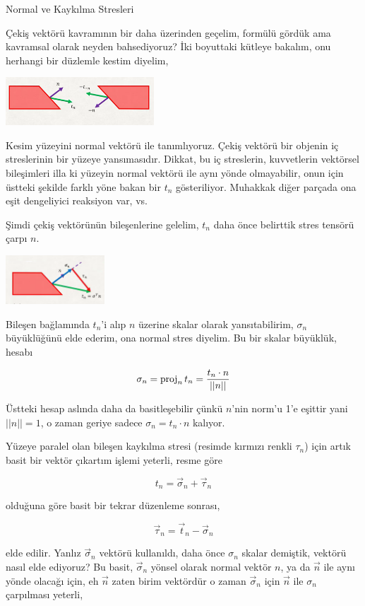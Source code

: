 \documentclass[12pt,fleqn]{article}\usepackage{../../common}
\begin{document}
Normal ve Kaykılma Stresleri

Çekiş vektörü kavramının bir daha üzerinden geçelim, formülü gördük ama
kavramsal olarak neyden bahsediyoruz? İki boyuttaki kütleye bakalım, onu
herhangi bir düzlemle kestim diyelim, 

\includegraphics[width=15em]{phy_020_strs_02_06.png}

Kesim yüzeyini normal vektörü ile tanımlıyoruz. Çekiş vektörü bir objenin iç
streslerinin bir yüzeye yansımasıdır. Dikkat, bu iç streslerin, kuvvetlerin
vektörsel bileşimleri illa ki yüzeyin normal vektörü ile aynı yönde olmayabilir,
onun için üstteki şekilde farklı yöne bakan bir $t_n$ gösteriliyor. Muhakkak
diğer parçada ona eşit dengeliyici reaksiyon var, vs.

Şimdi çekiş vektörünün bileşenlerine gelelim, $t_n$ daha önce belirttik stres
tensörü çarpı $n$. 

\includegraphics[width=10em]{phy_020_strs_02_07.png}

Bileşen bağlamında $t_n$'i alıp $n$ üzerine skalar olarak yansıtabilirim,
$\sigma_n$ büyüklüğünü elde ederim, ona normal stres diyelim. Bu bir skalar
büyüklük, hesabı

$$
\sigma_n = \operatorname{proj}_n t_n = \frac{t_n \cdot n}{||n||}
$$

Üstteki hesap aslında daha da basitleşebilir çünkü $n$'nin norm'u 1'e
eşittir yani $||n||=1$, o zaman geriye sadece $\sigma_n = t_n \cdot n$
kalıyor.

Yüzeye paralel olan bileşen kaykılma stresi (resimde kırmızı renkli $\tau_n$)
için artık basit bir vektör çıkartım işlemi yeterli, resme göre

$$
t_n = \vec{\sigma}_n + \vec{\tau}_n 
$$

olduğuna göre basit bir tekrar düzenleme sonrası,

$$
\vec{\tau}_n  = \vec{t}_n - \vec{\sigma}_n 
$$

elde edilir. Yanlız $\vec{\sigma}_n$ vektörü kullanıldı, daha önce $\sigma_n$
skalar demiştik, vektörü nasıl elde ediyoruz? Bu basit, $\vec{\sigma}_n$
yönsel olarak normal vektör $n$, ya da $\vec{n}$ ile aynı yönde olacağı
için, eh $\vec{n}$ zaten birim vektördür o zaman $\vec{\sigma}_n$ için
$\vec{n}$ ile $\sigma_n$ çarpılması yeterli,
\end{document}
